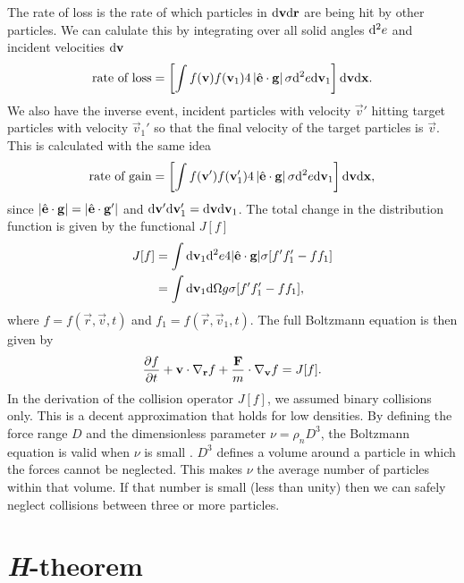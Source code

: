 The rate of loss is the rate of which particles in $\mathrm{d}\mathbf v\mathrm{d}\mathbf r$ are being hit by other particles. We can calulate this by integrating over all solid angles $\mathrm{d}^2 e$ and incident velocities $\mathrm{d}\mathbf v$
\begin{align}
	\text{rate of loss} = \left[\int f(\mathbf v)f(\mathbf v_1)4\left|\hat {\mathbf{e}} \cdot \mathbf g \right|\sigma \mathrm{d}^2 e\mathrm{d}\mathbf v_1\right]\mathrm{d}\mathbf v\mathrm{d}\mathbf x.
\end{align}
We also have the inverse event, incident particles with velocity $\vec v'$ hitting target particles with velocity $\vec v_1'$ so that the final velocity of the target particles is $\vec v$. This is calculated with the same idea
\begin{align}
	\text{rate of gain} = \left[\int f(\mathbf v')f(\mathbf v_1')4\left|\hat {\mathbf{e}} \cdot \mathbf g \right|\sigma \mathrm{d}^2 e\mathrm{d}\mathbf v_1\right]\mathrm{d}\mathbf v\mathrm{d}\mathbf x,
\end{align}
since $|\hat {\mathbf{e}}\cdot \mathbf g| = |\hat {\mathbf{e}}\cdot \mathbf g'|$ and $\mathrm{d}\mathbf v'\mathrm{d}\mathbf v_1' = \mathrm{d}\mathbf v\mathrm{d}\mathbf v_1$. The total change in the distribution function is given by the functional $J[f]$
\begin{align}
	J[f] &= \int \mathrm{d}\mathbf v_1 \mathrm{d}^2 e4|\hat {\mathbf{e}}\cdot\mathbf g|\sigma[f'f_1' - ff_1]\\
	&= \int \mathrm{d}\mathbf v_1 \mathrm{d}\Omega g \sigma[f'f_1' - ff_1],
\end{align}
where $f = f(\vec r, \vec v, t)$ and $f_1 = f(\vec r, \vec v_1, t)$. The full Boltzmann equation is then given by
\begin{align}
	\label{eq:boltzmann_equation}
	\frac{\partial f}{\partial t} + \mathbf v\cdot \nabla_\mathbf r f + \frac{\mathbf F}{m}\cdot\nabla_\mathbf v f = J[f].
\end{align}
In the derivation of the collision operator $J[f]$, we assumed binary collisions only. This is a decent approximation that holds for low densities. By defining the force range $D$ and the dimensionless parameter $\nu = \rho_n D^3$, the Boltzmann equation is valid when $\nu$ is small \cite{mclennan1989introduction}. $D^3$ defines a volume around a particle in which the forces cannot be neglected. This makes $\nu$ the average number of particles within that volume. If that number is small (less than unity) then we can safely neglect collisions between three or more particles.
\section{\textit{H}-theorem}

